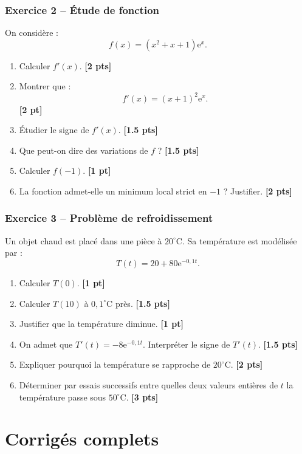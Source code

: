 \documentclass[11pt,a4paper]{article}
\newcommand{\e}{\mathrm{e}}
\newcommand{\pts}[1]{\hfill \textbf{[#1 pt]}}
\newcommand{\ptss}[1]{\hfill \textbf{[#1 pts]}}
\begin{document}
\subsubsection*{Exercice 2 -- Étude de fonction}

On considère :
\[
f(x)=(x^2+x+1)\e^x.
\]
\begin{enumerate}
    \item Calculer $f'(x)$. \ptss{2}
    \item Montrer que :
    \[
    f'(x)=(x+1)^2\e^x.
    \]
    \pts{2}
    \item Étudier le signe de $f'(x)$. \ptss{1.5}
    \item Que peut-on dire des variations de $f$ ? \ptss{1.5}
    \item Calculer $f(-1)$. \pts{1}
    \item La fonction admet-elle un minimum local strict en $-1$ ? Justifier. \ptss{2}
\end{enumerate}

\subsubsection*{Exercice 3 -- Problème de refroidissement}

Un objet chaud est placé dans une pièce à $20^\circ$C. Sa température est modélisée par :
\[
T(t)=20+80\e^{-0,1t}.
\]
\begin{enumerate}
    \item Calculer $T(0)$. \pts{1}
    \item Calculer $T(10)$ à $0,1^\circ$C près. \ptss{1.5}
    \item Justifier que la température diminue. \pts{1}
    \item On admet que $T'(t)=-8\e^{-0,1t}$. Interpréter le signe de $T'(t)$. \ptss{1.5}
    \item Expliquer pourquoi la température se rapproche de $20^\circ$C. \ptss{2}
    \item Déterminer par essais successifs entre quelles deux valeurs entières de $t$ la température passe sous $50^\circ$C. \ptss{3}
\end{enumerate}

\newpage

\section{Corrigés complets}

\end{document}
